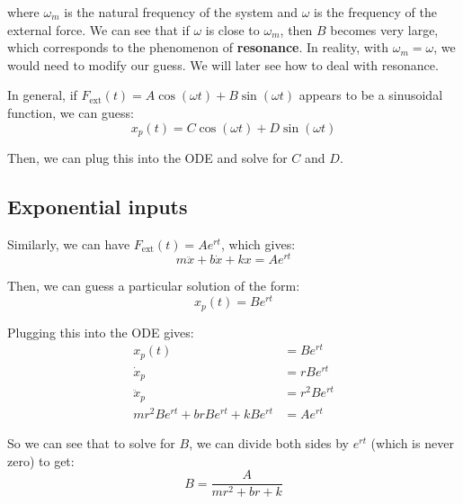 where $\omega_m$ is the natural frequency of the system and $\omega$ is the frequency of the external force. We can see that if $\omega$ is close to $\omega_m$, then $B$ becomes very large, which corresponds to the phenomenon of \textbf{resonance}. In reality, with $\omega_m = \omega$, we would need to modify our guess. We will later see how to deal with resonance.

In general, if $F_{\text{ext}}(t) = A \cos (\omega t) + B \sin (\omega t)$ appears to be a sinusoidal function, we can guess:
\begin{equation*}
x_p(t) = C \cos (\omega t) + D \sin (\omega t)
\end{equation*}

Then, we can plug this into the ODE and solve for $C$ and $D$.

\subsection{Exponential inputs}
Similarly, we can have $F_{\text{ext}}(t) = A e^{r t}$, which gives:
\begin{equation*}
m \ddot x + b \dot x + k x = A e^{r t}
\end{equation*}

Then, we can guess a particular solution of the form:
\begin{equation*}
x_p(t) = B e^{r t}
\end{equation*}

Plugging this into the ODE gives:
\begin{align*}
x_p(t) &= B e^{r t} \\
\dot x_p &= r B e^{r t} \\
\ddot x_p &= r^2 B e^{r t} \\
m r^2 B e^{r t} + b r B e^{r t} + k B e^{r t} &= A e^{r t}
\end{align*}

So we can see that to solve for $B$, we can divide both sides by $e^{r t}$ (which is never zero) to get:
\begin{equation*}
B = \frac{A}{m r^2 + b r + k}
\end{equation*}


